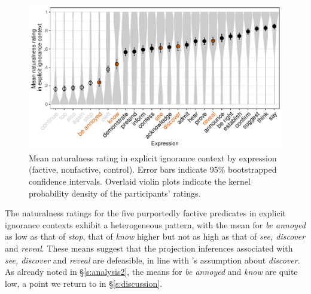 \documentclass[11pt,fleqn]{article}
\newcommand{\6}{\mbox{$[\hspace*{-.6mm}[$}}
\newcommand{\9}{\mbox{$]\hspace*{-.6mm}]$}}
\newcommand{\citepos}[1]{\citeauthor{#1}'s \citeyear{#1}}
\begin{document}
\begin{figure}[h!]
\centering
\includegraphics[width=.9\textwidth]{../../../results/main/graphs/explicit-ignorance-naturalness-by-predicate}
\caption{Mean naturalness rating in explicit ignorance context by expression (\color{orange}factive\color{black}, \color{black}nonfactive\color{black}, \color{gray}control\color{black}). Error bars indicate 95\% bootstrapped confidence intervals. Overlaid violin plots indicate the kernel probability density of the participants' ratings.}\label{fig:acc-by-expression}
\end{figure}

The naturalness ratings for the five purportedly factive predicates in explicit ignorance contexts exhibit a heterogeneous pattern, with the mean for \emph{be annoyed} as low as that of \emph{stop}, that of \emph{know} higher but not as high as that of \emph{see, discover} and \emph{reveal}. These means suggest that the projection inferences associated with \emph{see, discover} and \emph{reveal} are defeasible, in line with \citepos{simons01} assumption about \emph{discover}. As already noted in \S\ref{s:analysis2}, the means for \emph{be annoyed} and \emph{know} are quite low, a point we return to in \S\ref{s:discussion}.
\end{document}
